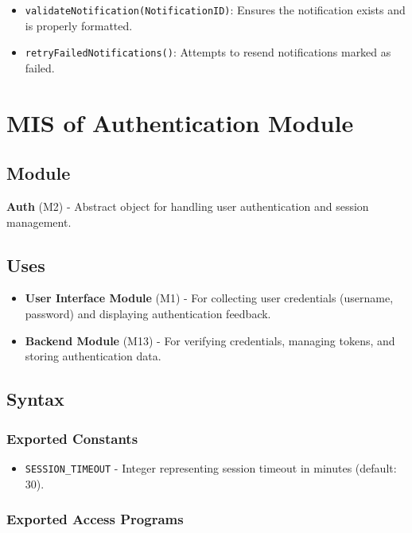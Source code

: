 \documentclass[12pt, titlepage]{article}
\begin{document}
\begin{itemize}
    \item \texttt{validateNotification(NotificationID)}: Ensures the notification exists and is properly formatted.
    \item \texttt{retryFailedNotifications()}: Attempts to resend notifications marked as failed.
\end{itemize}

\newpage

\section{MIS of Authentication Module} \label{Auth}

\subsection{Module}

\textbf{Auth} (M2) - Abstract object for handling user authentication and session management.

\subsection{Uses}

\begin{itemize}
	\item \textbf{User Interface Module} (M1) - For collecting user credentials (username, password)
	and displaying authentication feedback.
	\item \textbf{Backend Module} (M13) - For verifying credentials, managing tokens, and storing
	authentication data.
\end{itemize}


\subsection{Syntax}

\subsubsection{Exported Constants}
\begin{itemize}
	\item \texttt{SESSION\_TIMEOUT} - Integer representing session timeout in minutes (default: 30).
\end{itemize}

\subsubsection{Exported Access Programs}
\end{document}
